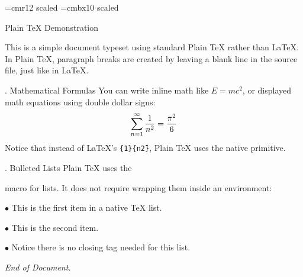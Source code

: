 
\hsize=6.5in
\vsize=9.0in
\hoffset=0.0in
\voffset=0.0in

\font\titlefont=cmr12 scaled 
\font\boldfont=cmbx10 scaled 
\centerline{\titlefont Plain TeX Demonstration}
\vskip 0.5in

This is a simple document typeset using standard {\boldfont Plain TeX} rather 
than LaTeX. In Plain TeX, paragraph breaks are created by leaving a blank line 
in the source file, just like in LaTeX.

\vskip 0.25in

{. Mathematical Formulas}
\medskip
You can write inline math like $E = mc^2$, or displayed math equations using 
double dollar signs:
$$ \sum_{n=1}^{\infty} {1 \over n^2} = {\pi^2 \over 6} $$
Notice that instead of \LaTeX's \vbox{\tt\string\frac\{1\}\{n\^2\}}, Plain TeX uses the 
native {\tt\string\over} primitive.

\vskip 0.25in

{. Bulleted Lists}
\medskip
Plain TeX uses the {\tt\string\item} macro for lists. It does not require wrapping 
them inside an environment:

\item{$\bullet$} This is the first item in a native TeX list.
\item{$\bullet$} This is the second item.
\item{$\bullet$} Notice there is no closing tag needed for this list.

\vskip 0.5in
\centerline{\it End of Document.}

\bye

